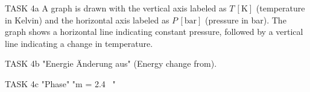 TASK 4a  
A graph is drawn with the vertical axis labeled as \( T \, [\text{K}] \) (temperature in Kelvin) and the horizontal axis labeled as \( P \, [\text{bar}] \) (pressure in bar). The graph shows a horizontal line indicating constant pressure, followed by a vertical line indicating a change in temperature.  

TASK 4b  
"Energie Änderung aus" (Energy change from).  

TASK 4c  
"Phase"  
"m = 2.4 \, "